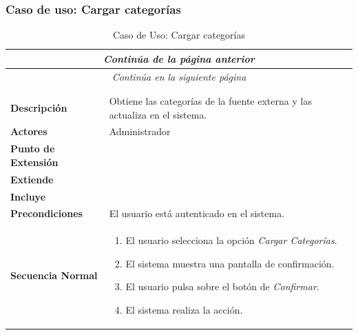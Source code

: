 \newpage
\subsubsection*{Caso de uso: Cargar categorías }
\begin{longtable}{| p{4cm} | p{10cm} |}
\endfirsthead
\multicolumn{2}{c}{\textit{Continúa de la página anterior}}\\[12pt]
\hline
\endhead
\hline
\multicolumn{2}{c}{\textit{Continúa en la siguiente página}} \\
\endfoot
\hline
\caption{Caso de Uso: Cargar categorías}\label{fig:1}\\
\endlastfoot


\hline
\multicolumn{2}{|c|}{\textbf{CU$<$43$>$ - Cargar Categorías}} \\

\hline
\textbf{Descripción} &
Obtiene las categorías de la fuente externa y las actualiza en el sistema.\\

\hline
\textbf{Actores} &
Administrador\\

\hline
\textbf{Punto de Extensión} &
\\

\hline
\textbf{Extiende} &
\\

\hline
\textbf{Incluye} &
\\

\hline
\textbf{Precondiciones} &
El usuario está autenticado en el sistema.\\

\hline
\textbf{Secuencia Normal} &\mbox{}\par\vspace{-\baselineskip}
\begin{enumerate}[leftmargin=0.7cm, topsep=0.1cm]
\item El usuario selecciona la opción \textit{Cargar Categorías}.
\item El sistema muestra una pantalla de confirmación.
\item El usuario pulsa sobre el botón de \textit{Confirmar}.
\item El sistema realiza la acción.
\end{enumerate}



\end{longtable}
